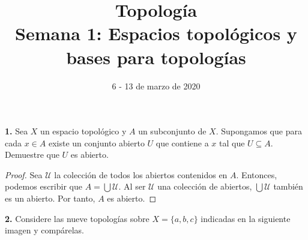 \documentclass{article}
\begin{document}
\date{6 - 13 de marzo de 2020}
\title{ \textbf{Topología} \\
Semana 1: Espacios topológicos y bases para topologías}
\maketitle	
\begin{mybox}
	\textbf{1. }  Sea $X$ un espacio topológico y $A$ un subconjunto de $X$. Supongamos que para cada $x \in A$ existe un conjunto abierto $U$ que contiene a $x$ tal que $U \subseteq A$. Demuestre que $U$ es abierto. 
\end{mybox}	

\begin{proof}
	Sea $\mathcal{U}$ la colección de todos los abiertos contenidos en $A$. Entonces, podemos escribir que
	$A =  \bigcup \mathcal{U} . $ Al ser $\mathcal{U}$ una colección de abiertos, $\bigcup \mathcal{U}$ también es un abierto. Por tanto, $A$ es abierto. 
\end{proof}

\begin{mybox}
	\textbf{2. }Considere las nueve topologías sobre $X = \{ a, b, c\}$  indicadas en la siguiente imagen y compárelas.  
\end{mybox}	
\end{document}
